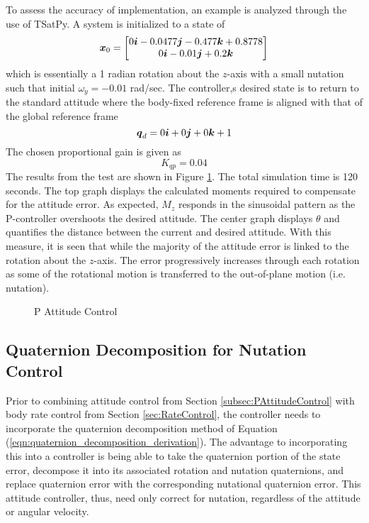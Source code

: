 To assess the accuracy of implementation, an example is analyzed through the use of TSatPy.  A system is initialized to a state of
\begin{equation}
  \boldsymbol{x}_0 = \begin{bmatrix} 0 \boldsymbol{i} -0.0477 \boldsymbol{j} -0.477 \boldsymbol{k} +0.8778 \\ 0 \boldsymbol{i} -0.01 \boldsymbol{j} +0.2 \boldsymbol{k} \end{bmatrix}
\end{equation}
which is essentially a 1 radian rotation about the $z$-axis with a small nutation such that initial $\omega_y = -0.01$ rad/sec.  The controller,s desired state is to return to the standard attitude where the body-fixed reference frame is aligned with that of the global reference frame
\begin{equation}
  \boldsymbol{q}_d = 0 \boldsymbol{i} +0 \boldsymbol{j} +0 \boldsymbol{k} + 1
\end{equation}
The chosen proportional gain is given as
\begin{equation}
  K_{qp} = 0.04
\end{equation}
The results from the test are shown in Figure \ref{fig:PAttitudeControl}.  The total simulation time is 120 seconds.  The top graph displays the calculated moments required to compensate for the attitude error.  As expected, $M_z$ responds in the sinusoidal pattern as the P-controller overshoots the desired attitude.  The center graph displays $\theta$ and quantifies the distance between the current and desired attitude.  With this measure, it is seen that while the majority of the attitude error is linked to the rotation about the $z$-axis.  The error progressively increases through each rotation as some of the rotational motion is transferred to the out-of-plane motion (i.e. nutation).
\begin{figure}[H]
  \centerline{}
  \caption{P Attitude Control}
  \label{fig:PAttitudeControl}
\end{figure}



\subsection{Quaternion Decomposition for Nutation Control}
\label{subsec:QuaternionDecompositionForNutationControl}

Prior to combining attitude control from Section \ref{subsec:PAttitudeControl} with body rate control from Section \ref{sec:RateControl}, the controller needs to incorporate the quaternion decomposition method of Equation (\ref{eqn:quaternion_decomposition_derivation}).  The advantage to incorporating this into a controller is being able to take the quaternion portion of the state error, decompose it into its associated rotation and nutation quaternions, and replace quaternion error with the corresponding nutational quaternion error.  This attitude controller, thus, need only correct for nutation, regardless of the attitude or angular velocity.

